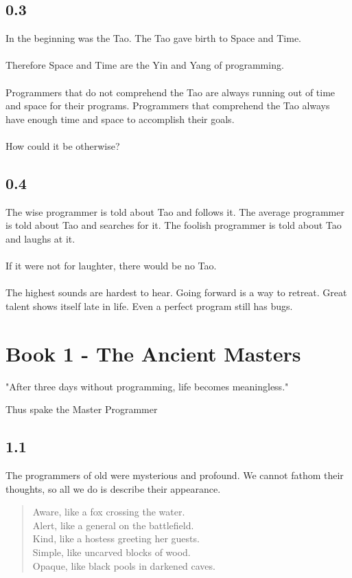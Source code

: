 \documentclass[14pt, letterpaper]{book}
\begin{document}
\section*{0.3}

In the beginning was the Tao. The Tao gave birth to Space and Time. \\
\\
Therefore Space and Time are the Yin and Yang of programming.\\
\\
Programmers that do not comprehend the Tao are always running out of time and space for their programs. Programmers that comprehend the Tao always have enough time and space to accomplish their goals.\\  
\\
How could it be otherwise?

\section*{0.4}

The wise programmer is told about Tao and follows it. The average programmer is told about Tao and searches for it. The foolish programmer is told about Tao and laughs at it.\\
\\
If it were not for laughter, there would be no Tao.\\
\\
The highest sounds are hardest to hear. Going forward is a way to retreat. Great talent shows itself late in life. Even a perfect program still has bugs.

\chapter*{Book 1 - The Ancient Masters}
\epigraph{"After three days without programming, life becomes meaningless."}{Thus spake the Master Programmer}

\section*{1.1}
The programmers of old were mysterious and profound. We cannot fathom their thoughts, so all we do is describe their appearance.\\

\begin{verse}
Aware, like a fox crossing the water. \\
Alert, like a general on the battlefield. \\
Kind, like a hostess greeting her guests. \\
Simple, like uncarved blocks of wood. \\
Opaque, like black pools in darkened caves. \\
\end{verse}
\end{document}
